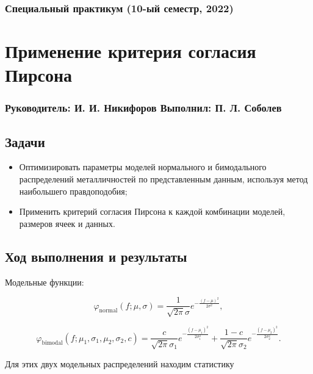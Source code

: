 \documentclass[a4paper, oneside]{article}
\newcommand{\su}{\vspace{-0.5em}}
\begin{document}
\subsubsection*{Специальный практикум (10-ый семестр, 2022)}
\section*{Применение критерия согласия Пирсона}
\subsubsection*{Руководитель: И. И. Никифоров \hspace{2em} Выполнил: П. Л. Соболев}

\vspace{3em}

\subsection*{Задачи}

\begin{itemize}
  \setlength\itemsep{-0.1em}
  \item Оптимизировать параметры моделей нормального и бимодального распределений металличностей по представленным данным, используя метод наибольшего правдоподобия;
  \item Применить критерий согласия Пирсона к каждой комбинации моделей, размеров ячеек и данных.
\end{itemize}

\subsection*{Ход выполнения и результаты}

Модельные функции:

\su
\begin{equation}
  \varphi_\text{normal}(f; \mu, \sigma) = \frac{1}{\sqrt{2 \pi} \sigma} e^{\displaystyle -\frac{(f - \mu)^2}{2 \sigma^2}},
\end{equation}

\su
\begin{equation}
  \varphi_\text{bimodal}(f; \mu_1, \sigma_1, \mu_2, \sigma_2, c) = \frac{c}{\sqrt{2 \pi} \sigma_1} e^{\displaystyle -\frac{(f - \mu_1)^2}{2 \sigma_1^2}} + \frac{1 - c}{\sqrt{2 \pi} \sigma_2} e^{\displaystyle -\frac{(f - \mu_2)^2}{2 \sigma_2^2}}.
\end{equation}


Для этих двух модельных распределений находим статистику
\end{document}

